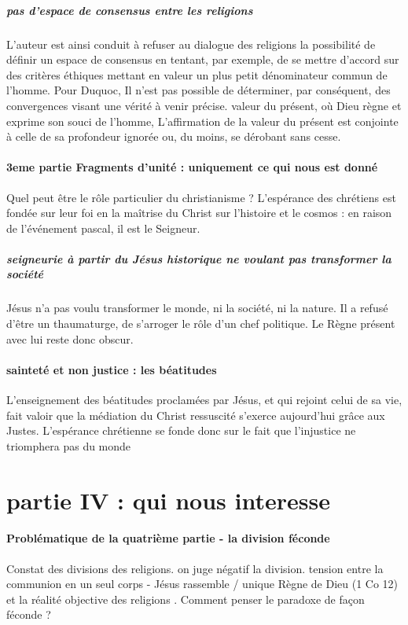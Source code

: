  \subparagraph{pas d'espace de consensus entre les religions}
{L’auteur est ainsi conduit à refuser au dialogue des religions la possibilité de définir un espace de consensus en tentant, par exemple, de se mettre d’accord sur des critères éthiques mettant en valeur un plus petit dénominateur commun 
 de l'homme. }  Pour Duquoc, Il n’est pas possible de déterminer, par conséquent, des convergences visant une vérité à venir précise. valeur  du présent, où Dieu règne et exprime son souci de l’homme, L’affirmation de la valeur du présent est  conjointe à celle de sa profondeur ignorée ou, du moins, se dérobant sans cesse.

\paragraph{3eme partie Fragments d'unité : uniquement ce qui nous est donné }
Quel peut être le rôle particulier du christianisme ? L’espérance des chrétiens est fondée sur leur foi en la maîtrise du Christ sur l’histoire et le cosmos : en raison de l’événement pascal, il est le Seigneur. 
\subparagraph{seigneurie à partir du Jésus historique ne voulant pas transformer la société} 
 Jésus n’a pas voulu transformer le monde, ni la société, ni la nature. Il a refusé d’être un thaumaturge, de s’arroger le rôle d’un chef politique. Le Règne présent avec lui reste donc obscur.  
\paragraph{sainteté et non justice : les béatitudes}
L’enseignement des béatitudes proclamées par Jésus, et qui rejoint celui de sa vie, fait valoir que la médiation du Christ ressuscité s’exerce aujourd’hui grâce aux Justes. L’espérance chrétienne se fonde donc sur le fait que l’injustice ne triomphera pas du monde 
 


\section{partie IV : qui nous interesse}

 
\paragraph{Problématique de la quatrième partie - la division féconde} Constat des divisions des religions. on juge négatif la division. tension entre la communion en un seul corps - Jésus rassemble / unique Règne de Dieu (1 Co 12) et la réalité objective des religions .  Comment penser le paradoxe de façon féconde ?
 

